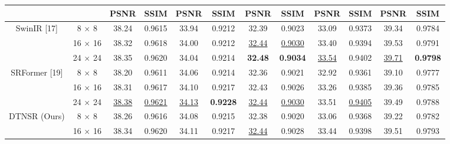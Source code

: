 \documentclass[journal]{IEEEtran}
\begin{document}
\begin{table*}
\begin{tabular}{|c|c|cc|cc|cc|cc|cc|}
\cline{3-12} && \multicolumn{1}{c|}{PSNR}  & SSIM & \multicolumn{1}{c|}{PSNR}  & SSIM  & \multicolumn{1}{c|}{PSNR}  & SSIM  & \multicolumn{1}{c|}{PSNR}  & SSIM & \multicolumn{1}{c|}{PSNR}  & SSIM \\
 \hline
  \multirow{3}{*}{SwinIR [17]} & {8 $\times$ 8}  & \multicolumn{1}{c|}{38.24} &{0.9615}  & \multicolumn{1}{c|}{33.94} &{0.9212} & \multicolumn{1}{c|}{32.39} &{0.9023} & \multicolumn{1}{c|}{33.09} &{0.9373}  & \multicolumn{1}{c|}{39.34} &{0.9784} \\
            & {16 $\times$ 16}   & \multicolumn{1}{c|}{38.32} &{0.9618}  & \multicolumn{1}{c|}{34.00} &{0.9212} & \multicolumn{1}{c|}{\color{blue}\underline{32.44}} &{\color{blue}\underline{0.9030}} & \multicolumn{1}{c|}{33.40} &{0.9394}  & \multicolumn{1}{c|}{39.53} &{0.9791} \\
            & {24 $\times$ 24} & \multicolumn{1}{c|}{38.35} &{0.9620}  & \multicolumn{1}{c|}{34.04} &{0.9214} & \multicolumn{1}{c|}{\color{red}\textbf{32.48}} &{\color{red}\textbf{0.9034}} & \multicolumn{1}{c|}{\color{blue}\underline{33.54}} &{0.9402}  & \multicolumn{1}{c|}{\color{blue}\underline{39.71}} &{\color{red}\textbf{0.9798}}  \\
  \hline
  \multirow{3}{*}{SRFormer [19]} & {8 $\times$ 8}  & \multicolumn{1}{c|}{38.20} &{0.9611}  & \multicolumn{1}{c|}{34.06} &{0.9214} & \multicolumn{1}{c|}{32.36} &{0.9021} & \multicolumn{1}{c|}{32.92} &{0.9361}  & \multicolumn{1}{c|}{39.10} &{0.9777} \\
            & {16 $\times$ 16}   & \multicolumn{1}{c|}{38.31} &{0.9617}  & \multicolumn{1}{c|}{34.10} &{0.9217} & \multicolumn{1}{c|}{32.43} &{0.9026} & \multicolumn{1}{c|}{33.26} &{0.9385}  & \multicolumn{1}{c|}{39.36} &{0.9785} \\
            & {24 $\times$ 24} & \multicolumn{1}{c|}{\color{blue}\underline{38.38}} &{\color{blue}\underline{0.9621}}  & \multicolumn{1}{c|}{\color{blue}\underline{34.13}} &{\color{red}\textbf{0.9228}} & \multicolumn{1}{c|}{\color{blue}\underline{32.44}} &{\color{blue}\underline{0.9030}} & \multicolumn{1}{c|}{33.51} &{\color{blue}\underline{0.9405}}  & \multicolumn{1}{c|}{39.49} &{0.9788}  \\
  \hline
  \multirow{3}{*}{DTNSR (Ours)} & {8 $\times$ 8}  & \multicolumn{1}{c|}{38.26} &{0.9616}  & \multicolumn{1}{c|}{34.08} &{0.9215} & \multicolumn{1}{c|}{32.38} &{0.9020} & \multicolumn{1}{c|}{33.06} &{0.9368}  & \multicolumn{1}{c|}{39.22} &{0.9782} \\
            & {16 $\times$ 16}   & \multicolumn{1}{c|}{38.34} &{0.9620}  & \multicolumn{1}{c|}{34.11} &{0.9217} & \multicolumn{1}{c|}{\color{blue}\underline{32.44}} &{0.9028} & \multicolumn{1}{c|}{33.44} &{0.9398}  & \multicolumn{1}{c|}{39.51} &{0.9793} \\

\end{tabular}
\end{table*}
\end{document}
